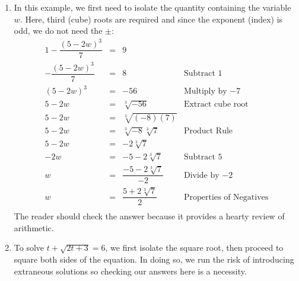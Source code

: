 \documentclass{ximera}
\begin{document}
{{{\begin{example}
\begin{enumerate}
\[\begin{array}{rclr}
5x+3 & = & \pm \sqrt[4]{16} & \text{Extract fourth roots} \\ [2pt]

5x + 3 & = & \pm 2 & \\ [2pt]

5x+3 = 2 & \text{or} & 5x+3 = -2 & \\

x = -\dfrac{1}{5} & \text{or} & x = -1 \\ \end{array} \] We leave it to the reader to verify that both of these solutions satisfy the original equation.

\item  In this example, we first need to isolate the quantity containing the variable $w$.  Here, third (cube) roots are required and since the exponent (index) is odd, we do not need the $\pm$:\[ \begin{array}{rclr} 

1 - \dfrac{(5-2w)^3}{7} & = &  9 & \\ [8pt]


- \dfrac{(5-2w)^3}{7} & = & 8 & \text{Subtract $1$} \\[8pt]

(5-2w) ^ 3 & = & -56 & \text{Multiply by $-7$} \\[2pt]

5 - 2w & = & \sqrt[3]{-56} & \text{Extract cube root} \\[2pt]

5 - 2w & = & \sqrt[3]{(-8)(7)} & \\[2pt]

5 - 2w & = & \sqrt[3]{-8} \sqrt[3]{7} & \text{Product Rule}\\[2pt]

5 - 2w & = & -2\sqrt[3]{7} & \\[2pt]

-2w & = & -5-2 \sqrt[3]{7} & \text{Subtract $5$} \\[2pt]

w & = & \dfrac{-5 - 2\sqrt[3]{7}}{-2} & \text{Divide by $-2$} \\[8pt]

w & = & \dfrac{5 + 2\sqrt[3]{7}}{2} & \text{Properties of Negatives} \\

\end{array}\] The reader should check the answer because it provides a hearty review of arithmetic.

\item  To solve  $t + \sqrt{2t+3} = 6$, we first isolate the square root, then proceed to square both sides of the equation.  In doing so, we run the risk of introducing extraneous solutions so checking our answers here is a necessity. \[ \begin{array}{rclr}


\end{array}\]
\end{enumerate}
\end{example}}}}
\end{document}
